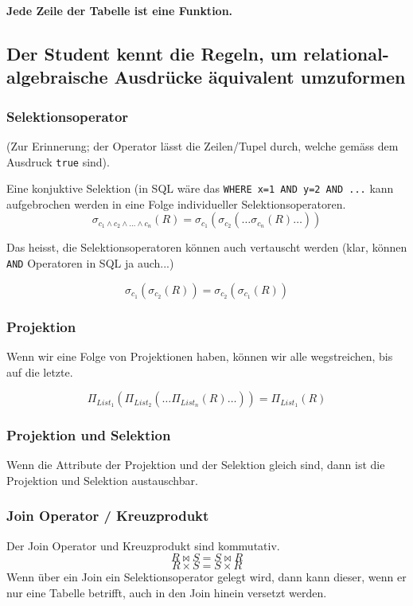 \textbf{Jede Zeile der Tabelle ist eine Funktion.}
\subsection{Der Student kennt die Regeln, um relational-algebraische Ausdrücke äquivalent umzuformen}\label{sec:umformung}
\subsubsection{Selektionsoperator}
(Zur Erinnerung; der Operator lässt die Zeilen/Tupel durch, welche gemäss dem Ausdruck \texttt{true} sind).

Eine konjuktive Selektion (in SQL wäre das \texttt{WHERE x=1 AND y=2 AND ...} kann aufgebrochen werden in eine Folge individueller Selektionsoperatoren.
\begin{equation}\label{konjuktive_selektion}
  \sigma _{c_1\wedge c_2 \wedge \dots \wedge c_n} (R) = \sigma _{c_1} (\sigma _{c_2}(\dots \sigma _{c_n} (R) \dots ))
\end{equation}

Das heisst, die Selektionsoperatoren können auch vertauscht werden (klar, können \texttt{AND} Operatoren in SQL ja auch...)

\begin{equation}
  \sigma _{c_1} (\sigma _{c_2} (R)) =  \sigma _{c_2} (\sigma _{c_1} (R)) 
\end{equation}

\subsubsection{Projektion}
Wenn wir eine Folge von Projektionen haben, können wir alle wegstreichen, bis auf die letzte.

\begin{equation*}
  \Pi _{List_1} ( \Pi _{List_2} ( \dots \Pi _{List_n} (R) \dots )) = \Pi _{List_1} (R)
\end{equation*}

\subsubsection{Projektion und Selektion}
Wenn die Attribute der Projektion und der Selektion gleich sind, dann ist die Projektion und Selektion austauschbar.

\subsubsection{Join Operator / Kreuzprodukt}
Der Join Operator und Kreuzprodukt sind kommutativ.
\begin{equation*}
  R \bowtie S = S \bowtie R
\end{equation*}
\begin{equation*}
  R \times S = S \times R
\end{equation*}
Wenn über ein Join ein Selektionsoperator gelegt wird, dann kann dieser, wenn er nur eine Tabelle betrifft, auch in den Join hinein versetzt werden.

